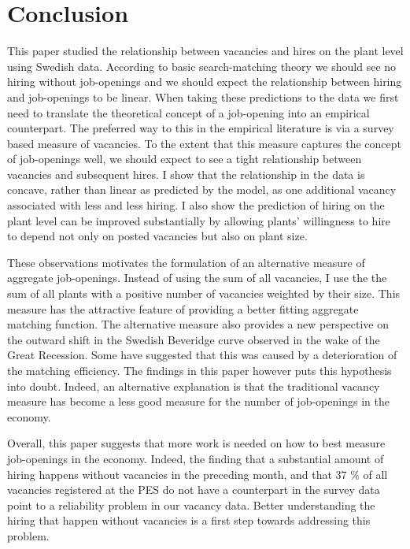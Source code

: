 \section{Conclusion}
\label{sec:conclusion}

This paper studied the relationship between vacancies and hires on the plant level using Swedish data. According to basic search-matching theory we should see no hiring without job-openings and we should expect the relationship between hiring and job-openings to be linear. When taking these predictions to the data we first need to translate the theoretical concept of a job-opening into an empirical counterpart. The preferred way to this in the empirical literature is via a survey based measure of vacancies. To the extent that this measure captures the concept of job-openings well, we should expect to see a tight relationship between vacancies and subsequent hires. I show that the relationship in the data is concave, rather than linear as predicted by the model, as one additional vacancy associated with less and less hiring. I also show the prediction of hiring on the plant level can be improved substantially by allowing plants' willingness to hire to depend not only on posted vacancies but also on plant size.

These observations motivates the formulation of an alternative measure of aggregate job-openings. Instead of using the sum of all vacancies, I use the the sum of all plants with a positive number of vacancies weighted by their size. This measure has the attractive feature of providing a better fitting aggregate matching function. The alternative measure also provides a new perspective on the outward shift in the Swedish Beveridge curve observed in the wake of the Great Recession. Some have suggested that this was caused by a deterioration of the matching efficiency. The findings in this paper however puts this hypothesis into doubt. Indeed, an alternative explanation is that the traditional vacancy measure has become a less good measure for the number of job-openings in the economy.

Overall, this paper suggests that more work is needed on how to best measure job-openings in the economy. Indeed, the finding that a substantial amount of hiring happens without vacancies in the preceding month, and that 37 \% of all vacancies registered at the PES do not have a counterpart in the survey data point to a reliability problem in our vacancy data. Better understanding the hiring that happen without vacancies is a first step towards addressing this problem.
